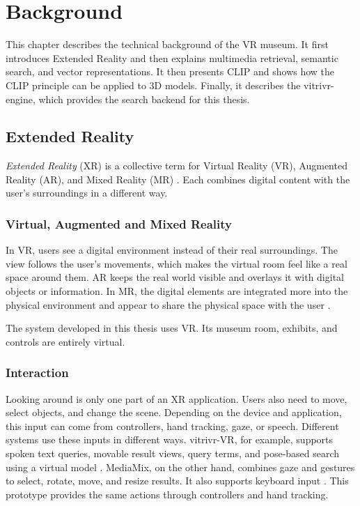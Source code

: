 \chapter{Background}
\label{ch:background}

\begingroup
\setaftersecskip{6pt}
\setlength{\emergencystretch}{2em}
This chapter describes the technical background of the VR museum. It first introduces Extended Reality and then explains multimedia retrieval, semantic search, and vector representations. It then presents CLIP and shows how the CLIP principle can be applied to 3D models. Finally, it describes the vitrivr-engine, which provides the search backend for this thesis.

\section{Extended Reality}
\label{sec:background-xr}

\emph{Extended Reality} (XR) is a collective term for Virtual Reality (VR), Augmented Reality (AR), and Mixed Reality (MR) \citep{yildirim2025exploringrealities}. Each combines digital content with the user's surroundings in a different way.

\subsection{Virtual, Augmented and Mixed Reality}
\label{subsec:background-xr-types}

In VR, users see a digital environment instead of their real surroundings. The view follows the user's movements, which makes the virtual room feel like a real space around them. AR keeps the real world visible and overlays it with digital objects or information. In MR, the digital elements are integrated more into the physical environment and appear to share the physical space with the user \citep{arnold2026mediamix,yildirim2025exploringrealities}.

The system developed in this thesis uses VR. Its museum room, exhibits, and controls are entirely virtual.

\enlargethispage{\baselineskip}
\subsection{Interaction}
\label{subsec:background-xr-interaction}

Looking around is only one part of an XR application. Users also need to move, select objects, and change the scene. Depending on the device and application, this input can come from controllers, hand tracking, gaze, or speech. Different systems use these inputs in different ways. vitrivr-VR, for example, supports spoken text queries, movable result views, query terms, and pose-based search using a virtual model \citep{spiess2022vitrivrvr}. MediaMix, on the other hand, combines gaze and gestures to select, rotate, move, and resize results. It also supports keyboard input \citep{arnold2026mediamix}. This prototype provides the same actions through controllers and hand tracking.

